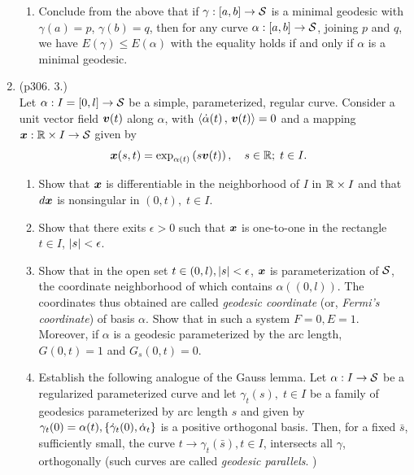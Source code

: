 \documentclass[11pt]{article}
\begin{document}
\begin{enumerate}
\begin{example}
\begin{enumerate}
\item Conclude from the above that if $\gamma: [a,b]\rightarrow {\mathcal S}$ is a minimal geodesic with $\gamma(a) = p$, $\gamma(b) = q$, then for any curve $\alpha:  [a,b]\rightarrow {\mathcal S}$, joining $p$ and $q$, we have $E(\gamma) \le E(\alpha) $ with the equality holds if and only if $\alpha$ is a minimal geodesic. 
\end{enumerate}
\end{example}

\item \begin{example}\citep{do1976differential} (p306. 3.)\\
Let $\alpha: I=[0,l]\rightarrow {\mathcal S}$ be a simple, parameterized, regular curve. Consider a unit vector field $\boldsymbol{v}(t)$ along $\alpha$, with $\left\langle \dot{\alpha}(t)\,,\, \boldsymbol{v}(t) \right\rangle=0$ and a mapping $\boldsymbol{x}: {\mathbb R}\times I \rightarrow {\mathcal S}$ given by 
\begin{align*}
\boldsymbol{x}(s,t) &= \exp_{\alpha(t)}\left(s\boldsymbol{v}(t)\right), \quad s\in {\mathbb R};\; t\in I.
\end{align*}
\begin{enumerate}
\item Show that $\boldsymbol{x}$ is differentiable in the neighborhood of $I$ in ${\mathbb R}\times I$ and that $d\boldsymbol{x}$ is nonsingular in $(0,t),\;t\in I$.
\item Show that there exits $\epsilon>0$ such that $\boldsymbol{x}$ is one-to-one in the rectangle $t\in I$, $\left\lvert s \right\rvert<\epsilon$.
\item Show that in the open set $t\in (0,l), \left\lvert s \right\rvert<\epsilon$, $\boldsymbol{x}$ is parameterization of ${\mathcal S}$, the coordinate neighborhood of which contains $\alpha((0,l))$. The coordinates thus obtained are called \emph{geodesic coordinate} (or, \emph{Fermi's coordinate}) of basis $\alpha$. Show that in such a system $F=0, E=1$. Moreover, if $\alpha$ is a geodesic parameterized by the arc length,  $G(0,t) = 1$ and $G_{s}(0,t) = 0$.
\item Establish the following analogue of the Gauss lemma. Let $\alpha: I\rightarrow {\mathcal S}$ be a regularized parameterized curve and let $\gamma_{t}(s),\;t\in I$ be a family of geodesics parameterized by arc length $s$ and given by $\gamma_{t}(0)=\alpha(t), \left\{\dot{\gamma}_{t}(0), \dot{\alpha}_{t}\right\}$ is a positive orthogonal basis. Then, for a fixed $\bar{s}$, sufficiently small, the curve $t\rightarrow \gamma_{t}(\bar{s}), t\in I$, intersects all $\gamma$, orthogonally (such curves are called \emph{geodesic parallels}. )
\end{enumerate}
\end{example}


\end{enumerate}
\end{document}
